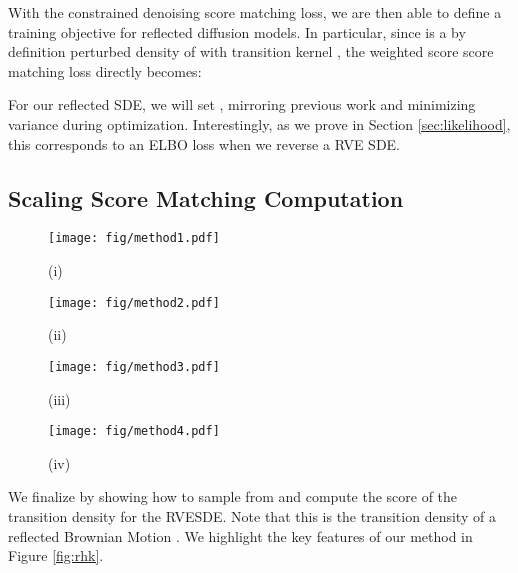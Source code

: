 \documentclass{article}
\theoremstyle{plain}
\theoremstyle{definition}
\theoremstyle{remark}
\begin{document}
With the constrained denoising score matching loss, we are then able to define a training objective for reflected diffusion models. In particular, since  is a by definition perturbed density of  with transition kernel , the weighted score score matching loss directly becomes:

For our reflected SDE, we will set , mirroring previous work and minimizing variance during optimization. Interestingly, as we prove in Section \ref{sec:likelihood}, this corresponds to an ELBO loss when we reverse a RVE SDE.

\subsection{Scaling Score Matching Computation}\label{sec:sm:scaling}

\begin{figure*}[h]
    \centering
    \begin{subfigure}[b]{0.24\textwidth}
        \texttt{[image: fig/method1.pdf]}
        \caption*{(i)}
    \end{subfigure}
    \hfill
    \begin{subfigure}[b]{0.24\textwidth}
        \texttt{[image: fig/method2.pdf]}
        \caption*{(ii)}
    \end{subfigure}
    \hfill
    \begin{subfigure}[b]{0.24\textwidth}
        \texttt{[image: fig/method3.pdf]}
        \caption*{(iii)}
    \end{subfigure}
    \hfill
    \begin{subfigure}[b]{0.24\textwidth}
        \texttt{[image: fig/method4.pdf]}
        \caption*{(iv)}
    \end{subfigure}
    \caption{\textbf{An overview of our computational method for constrained denoising score matching with Brownian transition probabilities.} (i) We can draw samples by sampling  and then applying reflections on the boundary. (ii) When  is small, we compute the transition density by summing up a mixture of Gaussians (shown for ). (iii) When  is large, we compute using the frequencies of  (shown for ). (iv) We diffeomorphically transform , where the transition score is tractable.}\label{fig:rhk}
\end{figure*}

We finalize by showing how to sample from and compute the score of the transition density  for the RVESDE. Note that this is the transition density of a reflected Brownian Motion \citep{Harrison1981ReflectedBM}. We highlight the key features of our method in Figure \ref{fig:rhk}.
\end{document}
